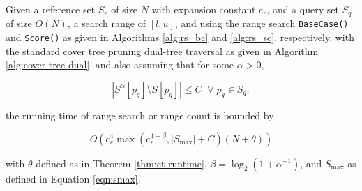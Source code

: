 \begin{thm}
Given a reference set $S_r$ of size $N$ with expansion constant $c_r$, and a
query set $S_q$ of size $O(N)$, a search range of $[l, u]$, and using the range
search \texttt{BaseCase()} and \texttt{Score()} as given in Algorithms
\ref{alg:rs_bc} and \ref{alg:rs_sc}, respectively, with the standard cover tree
pruning dual-tree traversal as given in Algorithm \ref{alg:cover-tree-dual}, and
also assuming that for some $\alpha > 0$,

\begin{equation}
| S^{\alpha}[p_q] \setminus S[p_q] | \le C \; \; \forall \; p_q \in S_q,
\end{equation}


\noindent the running time of range search or range count is bounded by

\begin{equation}
O\left(c_r^{4} \max\left(c_r^{4 + \beta}, |S_{\max}| + C\right) (N + \theta)
\right)
\end{equation}

with $\theta$ defined as in Theorem
\ref{thm:ct-runtime},
$\beta = \log_2 (1 + \alpha^{-1})$, and $S_{\max}$ as defined in Equation
\ref{eqn:smax}.
\label{thm:rs}
\end{thm}

